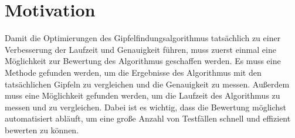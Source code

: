 \section{Motivation}\label{sec:motivation_testen}
Damit die Optimierungen des Gipfelfindungsalgorithmus tatsächlich zu einer Verbesserung der Laufzeit und Genauigkeit führen, muss zuerst einmal eine Möglichkeit zur Bewertung des Algorithmus geschaffen werden. Es muss eine Methode gefunden werden, um die Ergebnisse des Algorithmus mit den tatsächlichen Gipfeln zu vergleichen und die Genauigkeit zu messen. Außerdem muss eine Möglichkeit gefunden werden, um die Laufzeit des Algorithmus zu messen und zu vergleichen. Dabei ist es wichtig, dass die Bewertung möglichst automatisiert abläuft, um eine große Anzahl von Testfällen schnell und effizient bewerten zu können. 